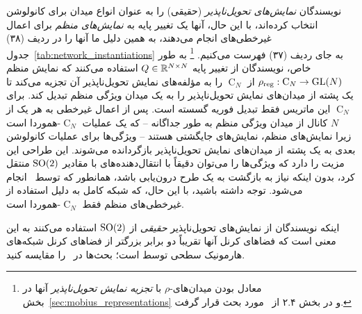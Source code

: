 نویسندگان \emph{نمایش‌های تحویل‌ناپذیر} (حقیقی) را به عنوان انواع میدان برای کانولوشن انتخاب کرده‌اند، با این حال، آنها یک تغییر پایه به \emph{نمایش‌های منظم} برای اعمال غیرخطی‌های  انجام می‌دهند، به همین دلیل ما آنها را در ردیف (۳۸) جدول~\ref{tab:network_instantiations} به جای ردیف (۳۷) فهرست می‌کنیم.%
\footnote{
    معادل بودن میدان‌های-$\rho$ با \emph{تجزیه نمایش تحویل‌ناپذیر} آنها در بخش~\ref{sec:mobius_representations} و در بخش ۲.۴ از~\cite{Weiler2019_E2CNN} مورد بحث قرار گرفت.
}
به طور خاص، نویسندگان از تغییر پایه $Q\in\mathbb{R}^{N\times N}$ استفاده می‌کنند که نمایش منظم $\rho_{\textup{reg}}: \operatorname{C}_N \to \operatorname{GL}(N)$ از $\operatorname{C}_N$ را به مؤلفه‌های نمایش تحویل‌ناپذیر آن تجزیه می‌کند تا یک پشته از میدان‌های نمایش تحویل‌ناپذیر را به یک میدان ویژگی منظم تبدیل کند.
برای $\operatorname{C}_N$ این ماتریس فقط تبدیل فوریه گسسته است.
پس از اعمال غیرخطی  به هر یک از $N$ کانال از میدان ویژگی منظم به طور جداگانه -- که یک عملیات $\operatorname{C}_N$-هموردا است زیرا نمایش‌های منظم، نمایش‌های جایگشتی هستند -- ویژگی‌ها برای عملیات کانولوشن بعدی به یک پشته از میدان‌های نمایش تحویل‌ناپذیر بازگردانده می‌شوند.
این طراحی این مزیت را دارد که ویژگی‌ها را می‌توان دقیقاً با انتقال‌دهنده‌های با مقادیر $\operatorname{SO}(2)$ منتقل کرد، بدون اینکه نیاز به بازگشت به یک طرح درون‌یابی باشد، همانطور که توسط~\citet{poulenard2018multi} انجام می‌شود.
توجه داشته باشید، با این حال، که شبکه کامل به دلیل استفاده از غیرخطی‌های منظم فقط $\operatorname{C}_N$-هموردا است.

اینکه نویسندگان از نمایش‌های تحویل‌ناپذیر \emph{حقیقی} از $\operatorname{SO}(2)$ استفاده می‌کنند به این معنی است که فضاهای کرنل آنها تقریباً دو برابر بزرگتر از فضاهای کرنل شبکه‌های هارمونیک سطحی توسط \citet{Wiersma2020} است؛ بحث‌ها در~\cite{Weiler2019_E2CNN,lang2020WignerEckart} را مقایسه کنید.



